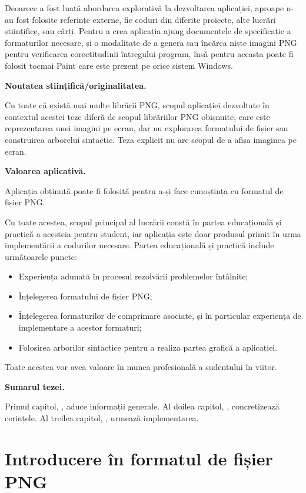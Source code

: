 \documentclass[a4paper,12pt]{report}
\begin{document}
Deoarece a fost luată abordarea explorativă la dezvoltarea aplicației,
aproape n-au fost folosite referințe externe,
fie coduri din diferite proiecte, alte lucrări științifice, sau cărți.
Pentru a crea aplicația ajung documentele de specificație a formaturilor necesare,
și o modalitate de a genera sau încărca niște imagini \ac{PNG}
pentru verificarea corectitudinii întregului program,
însă pentru aceasta poate fi folosit tocmai Paint care este prezent pe orice sistem Windows.

\textbf{Noutatea stiințifică/originalitatea.}

Cu toate că există mai multe librării \ac{PNG},
scopul aplicației dezvoltate în contextul acestei teze diferă de scopul librăriilor \ac{PNG} obișnuite,
care este reprezentarea unei imagini pe ecran,
dar nu explorarea formatului de fișier sau construirea arborelui sintactic.
Teza explicit nu are scopul de a afișa imaginea pe ecran.

\textbf{Valoarea aplicativă.}

Aplicația obținută poate fi folosită pentru a-și face cunoștința cu formatul de fișier \ac{PNG}.

Cu toate acestea, scopul principal al lucrării constă
în partea educațională și practică a acesteia pentru student,
iar aplicația este doar produsul primit în urma implementării a codurilor necesare.
Partea educațională și practică include următoarele puncte:
\begin{itemize}
    \item Experiența adunată în procesul rezolvării problemelor întâlnite;
    \item Înțelegerea formatului de fișier \ac{PNG};
    \item
        Înțelegerea formaturilor de comprimare asociate,
        și în particular experiența de implementare a acestor formaturi;
    \item Folosirea arborilor sintactice pentru a realiza partea grafică a aplicației.
\end{itemize}

Toate acestea vor avea valoare în munca profesională a sudentului în viitor.


\textbf{Sumarul tezei.}

Primul capitol, , aduce informații generale.
Al doilea capitol, , concretizează cerințele.
Al treilea capitol, , urmează implementarea.


\chapter{Introducere în formatul de fișier \acs{PNG}}\label{intro_chapter_title}
\end{document}
